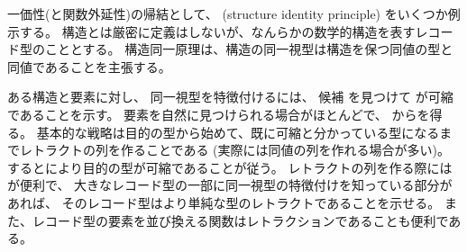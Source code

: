 \documentclass[index]{subfiles}
\begin{document}

一価性(と関数外延性)の帰結として、
(structure identity principle)
をいくつか例示する。
構造とは厳密に定義はしないが、なんらかの数学的構造を表すレコード型のこととする。
構造同一原理は、構造の同一視型は構造を保つ同値の型と同値であることを主張する。

ある構造と要素に対し、
同一視型を特徴付けるには、
候補
を見つけて
が可縮であることを示す。
要素を自然に見つけられる場合がほとんどで、
からを得る。
基本的な戦略は目的の型から始めて、既に可縮と分かっている型になるまでレトラクトの列を作ることである
(実際には同値の列を作れる場合が多い)。
するとにより目的の型が可縮であることが従う。
レトラクトの列を作る際にはが便利で、
大きなレコード型の一部に同一視型の特徴付けを知っている部分があれば、
そのレコード型はより単純な型のレトラクトであることを示せる。
また、レコード型の要素を並び換える関数はレトラクションであることも便利である。




\end{document}
